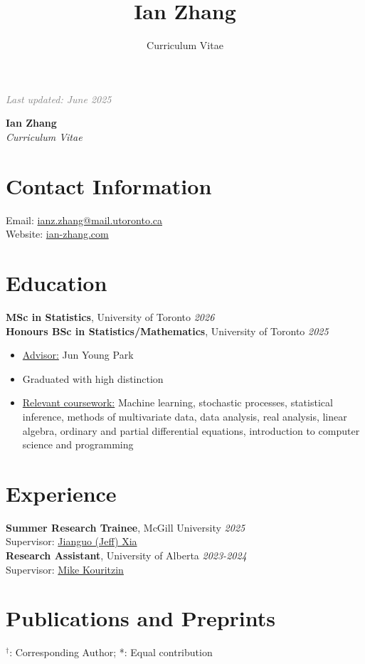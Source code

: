 \documentclass[11pt]{article}
\title{Ian Zhang}
\author{Curriculum Vitae}
\theoremstyle{definition}
\newcommand{\1}{\mathds 1}
\begin{document}
\sloppy
\hfill {\scriptsize\textit{\textcolor{gray}{Last updated: June 2025}}}
\begin{center}
    {\huge \textbf{Ian Zhang}}\\
    \textit{Curriculum Vitae}
\end{center}

\section*{Contact Information}
Email: \href{mailto:ianz.zhang@mail.utoronto.ca}{ianz.zhang@mail.utoronto.ca}\\
Website: \href{www.ian-zhang.com}{ian-zhang.com}

\section*{Education}
\textbf{MSc in Statistics}, University of Toronto \hfill \textit{2026}\\
\textbf{Honours BSc in Statistics/Mathematics}, University of Toronto \hfill \textit{2025}
\begin{itemize}[itemsep=2pt, parsep=0pt, topsep=0pt]
    \item \underline{Advisor:} Jun Young Park
    \item Graduated with high distinction
    \item \underline{Relevant coursework:} Machine learning, stochastic processes, statistical inference, methods of multivariate data, data analysis, real analysis, linear algebra, ordinary and partial differential equations, introduction to computer science and programming
  \end{itemize}
  

\section*{Experience}
\textbf{Summer Research Trainee}, McGill University \hfill \textit{2025}\\
\indent\hspace{0.2cm} Supervisor: \href{https://www.xialab.ca/}{Jianguo (Jeff) Xia}\\
\textbf{Research Assistant}, University of Alberta \hfill \textit{2023-2024}\\
\indent\hspace{0.2cm} Supervisor: \href{https://www.math.ualberta.ca/~mkouritz/Kouritzin_M.html}{Mike Kouritzin}

\section*{Publications and Preprints}
{\small $^\dag$: Corresponding Author; \hspace{1cm} *: Equal contribution}
\end{document}
